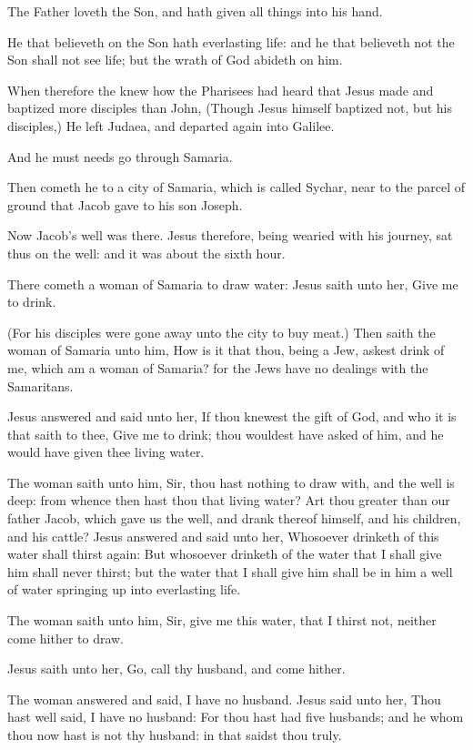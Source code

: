 \Verse The Father loveth the Son, and hath given all things into his hand.

\Verse He that believeth on the Son hath everlasting life: and he that believeth not the Son shall not see life; but the wrath of God abideth on him.


\Chapter
\Verse When therefore the \LORD knew how the Pharisees had heard that Jesus made and baptized more disciples than John, \Verse (Though Jesus himself baptized not, but his disciples,) \Verse He left Judaea, and departed again into Galilee.

\Verse And he must needs go through Samaria.

\Verse Then cometh he to a city of Samaria, which is called Sychar, near to the parcel of ground that Jacob gave to his son Joseph.

\Verse Now Jacob's well was there. Jesus therefore, being wearied with his journey, sat thus on the well: and it was about the sixth hour.

\Verse There cometh a woman of Samaria to draw water: Jesus saith unto her, Give me to drink.

\Verse (For his disciples were gone away unto the city to buy meat.)  \Verse Then saith the woman of Samaria unto him, How is it that thou, being a Jew, askest drink of me, which am a woman of Samaria? for the Jews have no dealings with the Samaritans.

\Verse Jesus answered and said unto her, If thou knewest the gift of God, and who it is that saith to thee, Give me to drink; thou wouldest have asked of him, and he would have given thee living water.

\Verse The woman saith unto him, Sir, thou hast nothing to draw with, and the well is deep: from whence then hast thou that living water?  \Verse Art thou greater than our father Jacob, which gave us the well, and drank thereof himself, and his children, and his cattle?  \Verse Jesus answered and said unto her, Whosoever drinketh of this water shall thirst again: \Verse But whosoever drinketh of the water that I shall give him shall never thirst; but the water that I shall give him shall be in him a well of water springing up into everlasting life.

\Verse The woman saith unto him, Sir, give me this water, that I thirst not, neither come hither to draw.

\Verse Jesus saith unto her, Go, call thy husband, and come hither.

\Verse The woman answered and said, I have no husband. Jesus said unto her, Thou hast well said, I have no husband: \Verse For thou hast had five husbands; and he whom thou now hast is not thy husband: in that saidst thou truly.

